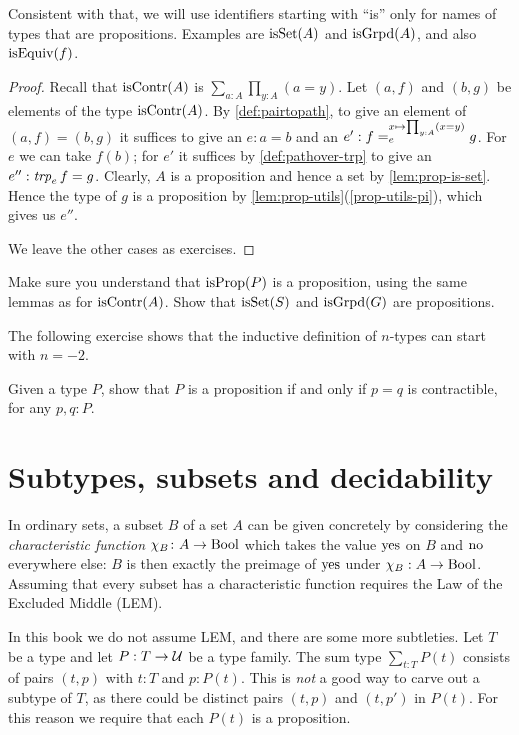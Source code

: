 Consistent with that, we will use identifiers starting with ``is'' only for names of types 
that are propositions. Examples are $\mathrm{isSet}(A)$ and $\mathrm{isGrpd}(A)$,
and also $\mathrm{isEquiv}(f)$.

\begin{proof}
Recall that $\mathrm{isContr}(A)$ is $\sum_{a:A} \prod_{y:A} (a=y)$.
Let $(a,f)$ and $(b,g)$ be elements of the type $\mathrm{isContr}(A)$.
By \cref{def:pairtopath}, to give an element of $(a,f) = (b,g)$ it suffices 
to give an $e : a=b$ and an $e' : f =^{x\mapsto\prod_{y:A} (x=y)}_{e} g$.
For $e$ we can take $f(b)$; for $e'$ it suffices by \cref{def:pathover-trp}
to give an $e'' : \trp e f = g$. Clearly, $A$ is a proposition and hence
a set by \cref{lem:prop-is-set}. Hence the type of $g$ is a proposition
by \cref{lem:prop-utils}(\ref{prop-utils-pi}), which gives us $e''$.

We leave the other cases as exercises.
\end{proof}

\begin{xca}\label{xca:isX-is-prop}
Make sure you understand that $\mathrm{isProp}(P)$ is a proposition,
using the same lemmas as for $\mathrm{isContr}(A)$.
Show that $\mathrm{isSet}(S)$ and $\mathrm{isGrpd}(G)$ are propositions.
\end{xca}

The following exercise shows that the inductive definition of $n$-types can start with $n=-2$.

\begin{xca}\label{xca:prop-contractible=}
  Given a type $P$, show that $P$ is a proposition if and only if $p=q$ is contractible, for any $p, q: P$.
\end{xca}

\section{Subtypes, subsets and decidability}
\label{sec:subtype}

In ordinary sets, a subset $B$ of a set $A$ can be given concretely by 
considering the \emph{characteristic function} $\chi_B\colon A\to\mathrm{Bool}$ 
which takes the value $\mathrm{yes}$ on $B$ and $\mathrm{no}$ everywhere else: 
$B$ is then exactly the preimage of $\mathrm{yes}$ under $\chi_B: A\to\mathrm{Bool}$.
Assuming that every subset has a characteristic function
requires the Law of the Excluded Middle (LEM).

In this book we do not assume LEM, and there are some more subtleties. 
Let $T$ be a type and let $P: T\to{\mathcal{U}}$ be a type family.
The sum type $\sum_{t:T} P(t)$ consists of pairs $(t,p)$ with
$t:T$ and $p:P(t)$. This is \emph{not} a good way to carve out a subtype
of $T$, as there could be distinct pairs $(t,p)$ and $(t,p')$ in $P(t)$.
For this reason we require that each $P(t)$ is a proposition.

